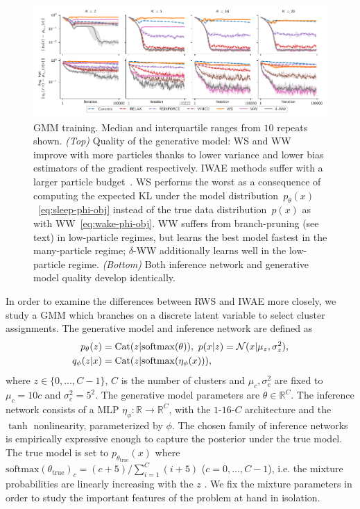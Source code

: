 \begin{figure}[!ht]
  \centering
  \includegraphics[width=\textwidth]{figures/RRWS/gmm/errors_no_std.pdf}
  \vspace*{-4ex}
  \caption{
    \Gls{GMM} training.
    Median and interquartile ranges from $10$ repeats shown.
    \emph{(Top)}
    Quality of the generative model:
    \gls{WS} and \gls{WW} improve with more particles thanks to lower variance and lower bias estimators of the gradient respectively.
    \Gls{IWAE} methods suffer with a larger particle budget~\citep{Rainforth2018tighter}.
    \Gls{WS} performs the worst as a consequence of computing the expected \gls{KL} under the model distribution~\(p_\theta(x)\)~\cref{eq:sleep-phi-obj} instead of the true data distribution~\(p(x)\) as with \gls{WW}~\cref{eq:wake-phi-obj}.
    \Gls{WW} suffers from branch-pruning (see text) in low-particle regimes, but learns the best model fastest in the many-particle regime; $\delta$-\gls{WW} additionally learns well in the low-particle regime.
    \emph{(Bottom)}
    Both inference network and generative model quality develop identically.
  }
  \label{fig:gmm}
  \vspace*{-1ex}
\end{figure}

In order to examine the differences between \gls{RWS} and \gls{IWAE} more closely, we study  a \gls{GMM} which branches on a discrete latent variable to select cluster assignments.
The generative model and inference network are defined as
\begin{align*}
  p_\theta(z) &= \mathrm{Cat}(z \lvert \mathrm{softmax}(\theta)),\,\,
  p(x \lvert z) = \mathcal{N}(x \lvert \mu_z, \sigma_z^2), \\
  q_\phi(z \lvert x) &= \mathrm{Cat}(z \lvert \mathrm{softmax}(\eta_\phi(x))),
\end{align*}
where $z \in \{0, \dotsc, C - 1\}$,  $C$ is the number of clusters and $\mu_c, \sigma_c^2$ are fixed to $\mu_c = 10c$ and $\sigma_c^2 = 5^2$.
The generative model parameters are $\theta \in \mathbb R^C$.
The inference network consists of a \acrlong{MLP} $\eta_\phi: \mathbb R \to \mathbb R^C$, with the $1$-$16$-$C$ architecture and the $\tanh$ nonlinearity, parameterized by $\phi$.
The chosen family of inference networks is empirically expressive enough to capture the posterior under the true model.
The true model is set to $p_{\theta_\text{true}}(x)$ where $\mathrm{softmax}(\theta_\text{true})_c = (c + 5) / \sum_{i = 1}^C (i + 5)$ ($c = 0, \dotsc, C - 1$), i.e. the mixture probabilities are linearly increasing with the $z$
.
We fix the mixture parameters in order to study the important features of the problem at hand in isolation.

